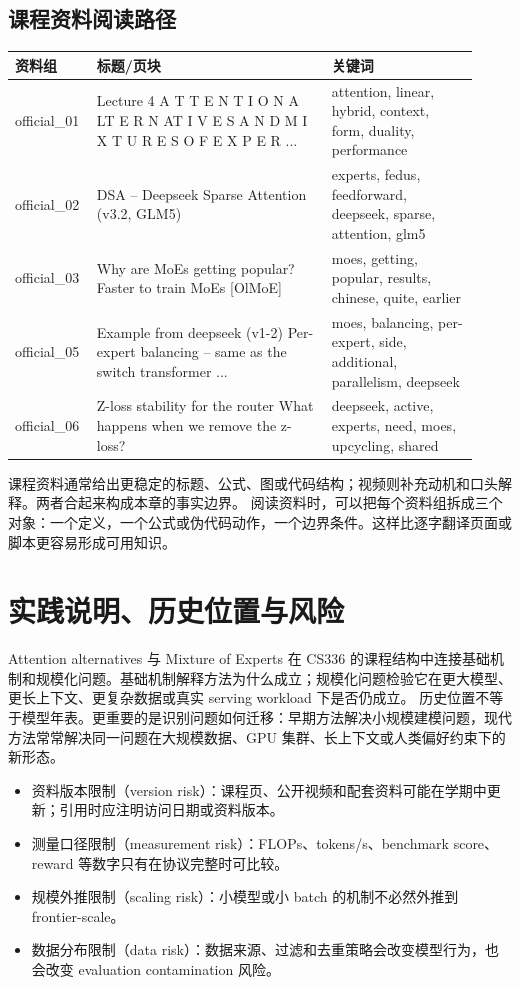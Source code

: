 \documentclass[a4paper]{article}
\begin{document}
\subsection{课程资料阅读路径}
\begin{longtable}{p{0.14\linewidth}p{0.48\linewidth}p{0.30\linewidth}}
\toprule
\textbf{资料组} & \textbf{标题/页块} & \textbf{关键词}\\
\midrule
official\_01 & Lecture 4 A T T E N T I O N A LT E R N AT I V E S A N D M I X T U R E S O F E X P E R ... & attention, linear, hybrid, context, form, duality, performance\\
official\_02 & DSA – Deepseek Sparse Attention (v3.2, GLM5) & experts, fedus, feedforward, deepseek, sparse, attention, glm5\\
official\_03 & Why are MoEs getting popular? Faster to train MoEs [OlMoE] & moes, getting, popular, results, chinese, quite, earlier\\
official\_05 & Example from deepseek (v1-2) Per-expert balancing – same as the switch transformer ... & moes, balancing, per-expert, side, additional, parallelism, deepseek\\
official\_06 & Z-loss stability for the router What happens when we remove the z-loss? & deepseek, active, experts, need, moes, upcycling, shared\\
\bottomrule
\end{longtable}
课程资料通常给出更稳定的标题、公式、图或代码结构；视频则补充动机和口头解释。两者合起来构成本章的事实边界。
阅读资料时，可以把每个资料组拆成三个对象：一个定义，一个公式或伪代码动作，一个边界条件。这样比逐字翻译页面或脚本更容易形成可用知识。
\section{实践说明、历史位置与风险}
Attention alternatives 与 Mixture of Experts 在 CS336 的课程结构中连接基础机制和规模化问题。基础机制解释方法为什么成立；规模化问题检验它在更大模型、更长上下文、更复杂数据或真实 serving workload 下是否仍成立。
历史位置不等于模型年表。更重要的是识别问题如何迁移：早期方法解决小规模建模问题，现代方法常常解决同一问题在大规模数据、GPU 集群、长上下文或人类偏好约束下的新形态。
\begin{itemize}
\item 资料版本限制（version risk）：课程页、公开视频和配套资料可能在学期中更新；引用时应注明访问日期或资料版本。
\item 测量口径限制（measurement risk）：FLOPs、tokens/s、benchmark score、reward 等数字只有在协议完整时可比较。
\item 规模外推限制（scaling risk）：小模型或小 batch 的机制不必然外推到 frontier-scale。
\item 数据分布限制（data risk）：数据来源、过滤和去重策略会改变模型行为，也会改变 evaluation contamination 风险。
\end{itemize}
\end{document}
